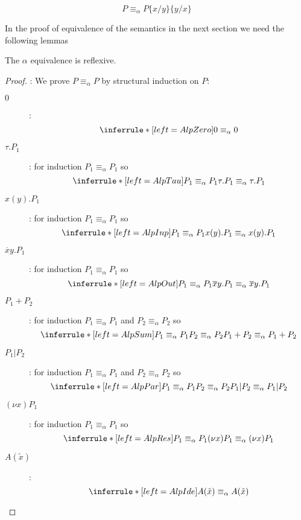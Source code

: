 \begin{lemma}
  \[
    P\equiv_{\alpha} P \{x/y\}\{y/x\}
  \]
\end{lemma}


In the proof of equivalence of the semantics in the next section we need the following lemmas


\begin{lemma}\label{alphaEquivalenceReflexivity}
  The $\alpha$ equivalence is reflexive.
  \begin{proof}:
	We prove $P\equiv_{\alpha}P$ by structural induction on $P$:
	\begin{description}
	  \item[$0$]:
	    \[\inferrule* [left=AlpZero]{
	    }{
	      0\equiv_{\alpha}0
	    }\]
	  \item[$\tau.P_{1}$]:
	    for induction $P_{1}\equiv_{\alpha}P_{1}$ so
	    \[\inferrule* [left=AlpTau]{
	      P_{1}\equiv_{\alpha}P_{1}
	    }{
	      \tau.P_{1}\equiv_{\alpha}\tau.P_{1}
	    }\]
	  \item[$x(y).P_{1}$]:
	    for induction $P_{1}\equiv_{\alpha}P_{1}$ so
	    \[\inferrule* [left=AlpInp]{
	      P_{1}\equiv_{\alpha}P_{1}
	    }{
	      x(y).P_{1}\equiv_{\alpha}x(y).P_{1}
	    }\]
	  \item[$\overline{x}y.P_{1}$]:
	    for induction $P_{1}\equiv_{\alpha}P_{1}$ so
	    \[\inferrule* [left=AlpOut]{
	      P_{1}\equiv_{\alpha}P_{1}
	    }{
	      \overline{x}y.P_{1}\equiv_{\alpha}\overline{x}y.P_{1}
	    }\]
	  \item[$P_{1}+P_{2}$]:
	    for induction $P_{1}\equiv_{\alpha}P_{1}$ and $P_{2}\equiv_{\alpha}P_{2}$ so
	    \[\inferrule* [left=AlpSum]{
		  P_{1}\equiv_{\alpha}P_{1}
		\\
		  P_{2}\equiv_{\alpha}P_{2}
	    }{
	      P_{1}+P_{2}\equiv_{\alpha}P_{1}+P_{2}
	    }\]
	  \item[$P_{1}|P_{2}$]:
	    for induction $P_{1}\equiv_{\alpha}P_{1}$ and $P_{2}\equiv_{\alpha}P_{2}$ so
	    \[\inferrule* [left=AlpPar]{
		  P_{1}\equiv_{\alpha}P_{1}
		\\
		  P_{2}\equiv_{\alpha}P_{2}
	    }{
	      P_{1}|P_{2}\equiv_{\alpha}P_{1}|P_{2}
	    }\]
	  \item[$(\nu x)P_{1}$]:
	    for induction $P_{1}\equiv_{\alpha}P_{1}$ so
	    \[\inferrule* [left=AlpRes]{
	      P_{1}\equiv_{\alpha}P_{1}
	    }{
	      (\nu x)P_{1}\equiv_{\alpha}(\nu x)P_{1}
	    }\]
	  \item[$A(\tilde{x})$]:
	    \[\inferrule* [left=AlpIde]{
	    }{
	      A(\tilde{x})\equiv_{\alpha}A(\tilde{x})
	    }\]
	\end{description}
  \end{proof}
\end{lemma}

